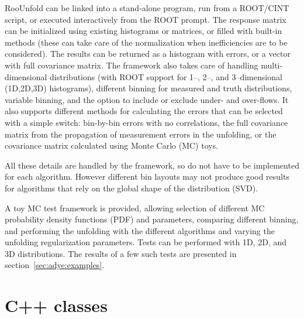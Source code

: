 \documentclass{cernrep}
\begin{document}
RooUnfold can be linked into a stand-alone program, run from a ROOT/CINT script, or
executed interactively from the ROOT prompt.
The response matrix can be initialized using existing histograms or matrices, or
filled with built-in methods (these can take care of the normalization when inefficiencies are to be considered).
The results can be returned as a histogram with errors, or a vector with full covariance matrix.
The framework also takes care of handling multi-dimensional distributions
(with ROOT support for 1--, 2--, and 3--dimensional (1D,2D,3D) histograms),
different binning for measured and truth distributions,
variable binning, and the option to include or exclude under- and over-flows.
It also supports different methods for calculating the errors that can
be selected with a simple switch: bin-by-bin errors with no correlations,
the full covariance matrix from the propagation of measurement errors in the unfolding, or
the covariance matrix calculated using Monte Carlo (MC) toys.

All these details are handled by the framework, so do not have to be
implemented for each algorithm. However different bin layouts may not produce good results for
algorithms that rely on the global shape of the distribution (SVD).

A toy MC test framework is provided, allowing
selection of different MC probability density functions (PDF) and parameters,
comparing different binning, and performing the unfolding with the different
algorithms and varying the unfolding regularization parameters.
Tests can be performed with 1D, 2D, and 3D distributions.
The results of a few such tests are presented in section~\ref{sec:adye:examples}.



\section{C++ classes}
\end{document}
